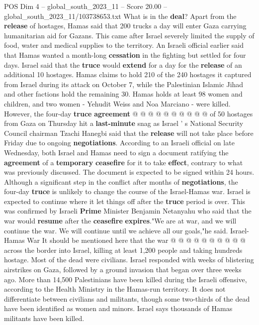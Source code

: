 \begin{textsample}{POS Dim 4 – global\_south\_2023\_11 – Score 20.00 – global\_south\_2023\_11/103738653.txt}
What is in the \textbf{deal}?
Apart from the \textbf{release} of hostages, Hamas said that 200 trucks a day will enter Gaza carrying humanitarian aid for Gazans.
This came after Israel severely limited the supply of food, water and medical supplies to the territory.
An Israeli official earlier said that Hamas wanted a month-long \textbf{cessation} in the fighting but settled for four days.
Israel said that the \textbf{truce} would \textbf{extend} for a day for the \textbf{release} of an additional 10 hostages.
Hamas claims to hold 210 of the 240 hostages it captured from Israel during its attack on October 7, while the Palestinian Islamic Jihad and other factions hold the remaining 30.
Hamas holds at least 98 women and children, and two women - Yehudit Weiss and Noa Marciano - were killed.
However, the four-day \textbf{truce} \textbf{agreement} @ @ @ @ @ @ @ @ @ @ of 50 hostages from Gaza on Thursday hit a \textbf{last-minute} snag as Israel ' s National Security Council chairman Tzachi Hanegbi said that the \textbf{release} will not take place before Friday due to ongoing \textbf{negotiations}.
According to an Israeli official on late Wednesday, both Israel and Hamas need to sign a document ratifying the \textbf{agreement} of a \textbf{temporary} \textbf{ceasefire} for it to take \textbf{effect}, contrary to what was previously discussed.
The document is expected to be signed within 24 hours.
Although a significant step in the conflict after months of \textbf{negotiations}, the four-day \textbf{truce} is unlikely to change the course of the Israel-Hamas war.
Israel is expected to continue where it let things off after the \textbf{truce} period is over.
This was confirmed by Israeli \textbf{Prime} Minister Benjamin Netanyahu who said that the war would \textbf{resume} after the \textbf{ceasefire} \textbf{expires}."We are at war, and we will continue the war.
We will continue until we achieve all our goals,"he said.
Israel-Hamas War It should be mentioned here that the war @ @ @ @ @ @ @ @ @ @ across the border into Israel, killing at least 1,200 people and taking hundreds hostage.
Most of the dead were civilians.
Israel responded with weeks of blistering airstrikes on Gaza, followed by a ground invasion that began over three weeks ago.
More than 14,500 Palestinians have been killed during the Israeli offensive, according to the Health Ministry in the Hamas-run territory.
It does not differentiate between civilians and militants, though some two-thirds of the dead have been identified as women and minors.
Israel says thousands of Hamas militants have been killed.

\end{textsample}

